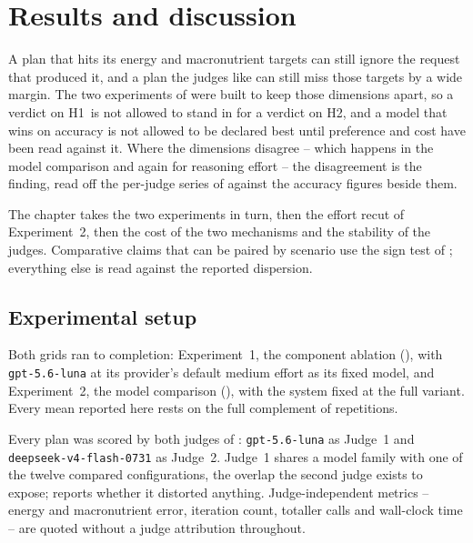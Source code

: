 \chapter{Results and discussion}
\label{cha:results}

A plan that hits its energy and macronutrient targets can still ignore the request that produced it, and a plan the judges like can still miss those targets by a wide margin. The two experiments of  were built to keep those dimensions apart, so a verdict on H1~is not allowed to stand in for a verdict on H2, and a model that wins on accuracy is not allowed to be declared best until preference and cost have been read against it. Where the dimensions disagree -- which happens in the model comparison and again for reasoning effort -- the disagreement is the finding, read off the per-judge series of  against the accuracy figures beside them.

The chapter takes the two experiments in turn, then the effort recut of Experiment~2, then the cost of the two mechanisms and the stability of the judges. Comparative claims that can be paired by scenario use the sign test of ; everything else is read against the reported dispersion.

\section{Experimental setup}
\label{sec:results-setup}

Both grids ran to completion: Experiment~1, the component ablation (), with \texttt{gpt-5.6-luna} at its provider's default medium effort as its fixed model, and Experiment~2, the model comparison (), with the system fixed at the full variant. Every mean reported here rests on the full complement of repetitions.

Every plan was scored by both judges of : \texttt{gpt-5.6-luna} as Judge~1 and \texttt{deepseek-v4-flash-0731} as Judge~2. Judge~1 shares a model family with one of the twelve compared configurations, the overlap the second judge exists to expose;  reports whether it distorted anything. Judge-independent metrics -- energy and macronutrient error, iteration count, totaller calls and wall-clock time -- are quoted without a judge attribution throughout.

